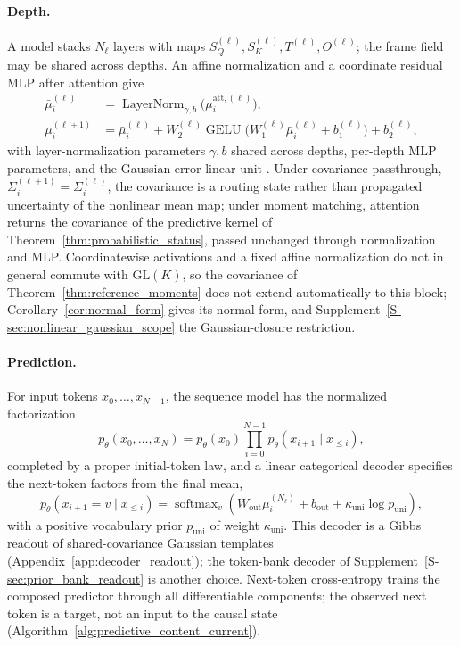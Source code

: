\documentclass[twoside,11pt]{article}
\begin{document}
\paragraph{Depth.}
\label{sec:depth_prediction}
A model stacks \(N_\ell\) layers with maps \(S_Q^{(\ell)},S_K^{(\ell)},T^{(\ell)},O^{(\ell)}\); the frame field may be shared across depths. An affine normalization and a coordinate residual MLP after attention give
\begin{align}
\bar\mu_i^{(\ell)}&=\operatorname{LayerNorm}_{\gamma,b}
 \bigl(\mu_i^{\mathrm{att},(\ell)}\bigr),\\
\mu_i^{(\ell+1)}&=\bar\mu_i^{(\ell)}
+W_2^{(\ell)}\operatorname{GELU}\bigl(W_1^{(\ell)}\bar\mu_i^{(\ell)}+b_1^{(\ell)}\bigr)
+b_2^{(\ell)},
\label{eq:relational_block_composition}
\end{align}
with layer-normalization parameters \(\gamma,b\) \citep{ba2016layernorm} shared across depths, per-depth MLP parameters, and the Gaussian error linear unit \citep{hendrycks2016gaussian}. Under covariance passthrough, \(\Sigma_i^{(\ell+1)}=\Sigma_i^{(\ell)}\), the covariance is a routing state rather than propagated uncertainty of the nonlinear mean map; under moment matching, attention returns the covariance of the predictive kernel of Theorem~\ref{thm:probabilistic_status}, passed unchanged through normalization and MLP. Coordinatewise activations and a fixed affine normalization do not in general commute with \(\mathrm{GL}(K)\), so the covariance of Theorem~\ref{thm:reference_moments} does not extend automatically to this block; Corollary~\ref{cor:normal_form} gives its normal form, and Supplement~\ref{S-sec:nonlinear_gaussian_scope} the Gaussian-closure restriction.

\paragraph{Prediction.}
\label{sec:autoregressive_prediction}
For input tokens \(x_0,\ldots,x_{N-1}\), the sequence model has the normalized factorization
\begin{equation}
p_\theta(x_0,\ldots,x_N)
=p_\theta(x_0)\prod_{i=0}^{N-1}p_\theta(x_{i+1}\mid x_{\le i}),
\label{eq:next_token_factorization_v2}
\end{equation}
completed by a proper initial-token law, and a linear categorical decoder specifies the next-token factors from the final mean,
\begin{equation}
p_\theta(x_{i+1}=v\mid x_{\le i})
=\operatorname{softmax}_v\left(
W_{\mathrm{out}}\mu_i^{(N_\ell)}+b_{\mathrm{out}}
+\kappa_{\mathrm{uni}}\log p_{\mathrm{uni}}\right),
\label{eq:predictive_linear_decoder}
\end{equation}
with a positive vocabulary prior \(p_{\mathrm{uni}}\) of weight \(\kappa_{\mathrm{uni}}\). This decoder is a Gibbs readout of shared-covariance Gaussian templates (Appendix~\ref{app:decoder_readout}); the token-bank decoder of Supplement~\ref{S-sec:prior_bank_readout} is another choice. Next-token cross-entropy trains the composed predictor through all differentiable components; the observed next token is a target, not an input to the causal state (Algorithm~\ref{alg:predictive_content_current}).
\end{document}
